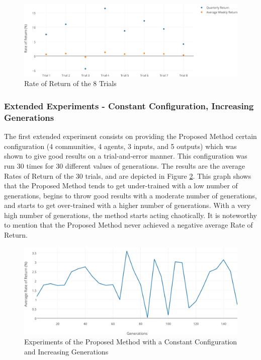\documentclass[12pt,journal,draftcls,onecolumn]{IEEEtran}
\begin{document}
\begin{figure}[htp]
\caption{Rate of Return of the 8 Trials}
\label{8-trials}
\begin{center}
\includegraphics[width=1\columnwidth]{figures/percent-return-per-trial/percent-return-per-trial.png}
\end{center}
\end{figure}

\subsubsection{Extended Experiments - Constant Configuration, Increasing Generations}

The first extended experiment consists on providing the Proposed
Method certain configuration (4 communities, 4 agents, 3 inputs, and 5
outputs) which was shown to give good results on a trial-and-error
manner. This configuration was run 30 times for 30 different values of
generations. The results are the average Rates of Return of the 30
trials, and are depicted in Figure
\ref{constant-configuration-generations}. This graph shows that the
Proposed Method tends to get under-trained with a low number of
generations, begins to throw good results with a moderate number of
generations, and starts to get over-trained with a higher number of
generations. With a very high number of generations, the method starts
acting chaotically. It is noteworthy to mention that the Proposed
Method never achieved a negative average Rate of Return.

\begin{figure}[htp]
\caption{Experiments of the Proposed Method with a Constant
  Configuration and Increasing Generations}
\label{constant-configuration-generations}
\begin{center}
\includegraphics[width=0.5\columnwidth]{figures/avg-rate-of-return/avg-rate-of-return.png}
\end{center}
\end{figure}
\end{document}
